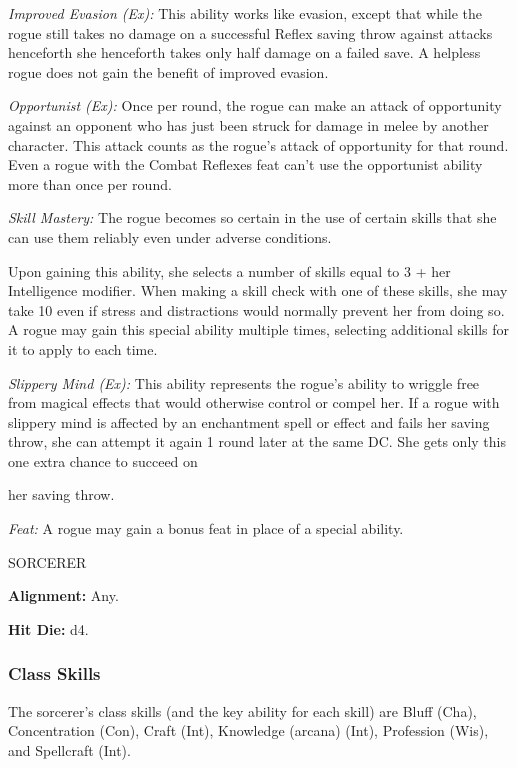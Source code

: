 \documentclass{article}
\begin{document}
\textit{Improved Evasion (Ex): }This ability works like evasion, except that while 
the rogue still takes no damage on a successful Reflex saving throw against attacks 
henceforth she henceforth takes only half damage on a failed save. A helpless rogue 
does not gain the benefit of improved evasion.

\textit{Opportunist (Ex): }Once per round, the rogue can make an attack of opportunity 
against an opponent who has just been struck for damage in melee by another character. 
This attack counts as the rogue's attack of opportunity for that round. Even a 
rogue with the Combat Reflexes feat can't use the opportunist ability more than 
once per round.

\textit{Skill Mastery: }The rogue becomes so certain in the use of certain skills 
that she can use them reliably even under adverse conditions.

Upon gaining this ability, she selects a number of skills equal to 3 + her Intelligence 
modifier. When making a skill check with one of these skills, she may take 10 even 
if stress and distractions would normally prevent her from doing so. A rogue may 
gain this special ability multiple times, selecting additional skills for it to 
apply to each time.

\textit{Slippery Mind (Ex): }This ability represents the rogue's ability to wriggle 
free from magical effects that would otherwise control or compel her. If a rogue 
with slippery mind is affected by an enchantment spell or effect and fails her 
saving throw, she can attempt it again 1 round later at the same DC. She gets only 
this one extra chance to succeed on

her saving throw.

\textit{Feat: }A rogue may gain a bonus feat in place of a special ability.

\vspace{12pt}
{\LARGE{}SORCERER}

\textbf{Alignment:} Any.

\textbf{Hit Die:} d4.

\vspace{12pt}
\subsubsection*{\textbf{Class Skills}}

The sorcerer's class skills (and the key ability for each skill) are Bluff (Cha), 
Concentration (Con), Craft (Int), Knowledge (arcana) (Int), Profession (Wis), and 
Spellcraft (Int).
\end{document}
